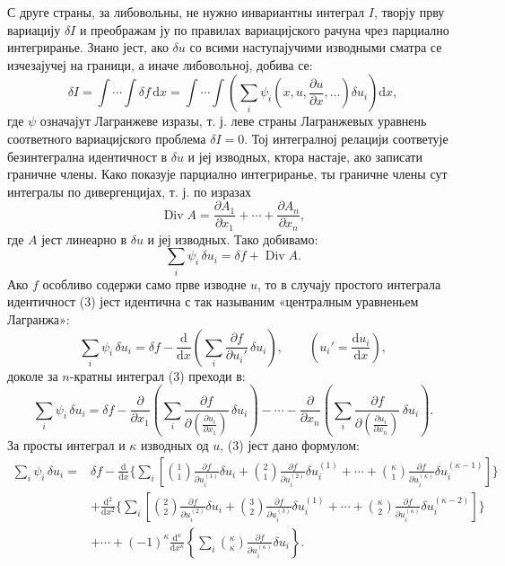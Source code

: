 ﻿\documentclass[11pt]{article}
\providecommand{\p}{\partial}
\providecommand{\dd}{\mathrm d}
\DeclareMathOperator{\Div}{Div}
\begin{document}
С друге страны, за либовольны, не нужно инвариантны интеграл \(I\), творју прву вариацију \(\delta I\) и преображам ју по правилах вариацијского рачуна чрез парциално интегриранье. Знано јест, ако \(\delta u\) со всими наступајучими изводными сматра се изчезајучеј на граници, а иначе либовольној, добива се:
\begin{equation}
\delta I=\int\!\cdots\!\int \delta f\,\dd x
=\int\!\cdots\!\int\left(\sum_i\psi_i\!\left(x,u,\frac{\p u}{\p x},\ldots\right)\delta u_i\right)\dd x,
\tag{2}
\end{equation}
где \(\psi\) означајут Лагранжеве изразы, т. ј. леве страны Лагранжевых уравнень соответного вариацијского проблема \(\delta I=0\). Тој интегралној релацији соответује безинтегрална идентичност в \(\delta u\) и јеј изводных, ктора настаје, ако записати граничне члены. Како показује парциално интегриранье, ты граничне члены сут интегралы по дивергенцијах, т. ј. по изразах
\[
\Div A=\frac{\p A_1}{\p x_1}+\cdots+\frac{\p A_n}{\p x_n},
\]
где \(A\) јест линеарно в \(\delta u\) и јеј изводных. Тако добивамо:
\begin{equation}
\sum_i\psi_i\,\delta u_i=\delta f+\Div A.
\tag{3}
\end{equation}
Ако \(f\) особливо содержи само прве изводне \(u\), то в случају простого интеграла идентичност (3) јест идентична с так называним «централным уравненьем Лагранжа»:
\begin{equation}
\sum_i \psi_i\,\delta u_i
=\delta f-\frac{\dd}{\dd x}\left(\sum_i\frac{\p f}{\p u_i'}\,\delta u_i\right),
\qquad \left(u_i'=\frac{\dd u_i}{\dd x}\right),
\tag{4}
\end{equation}
доколе за \(n\)-кратны интеграл (3) преходи в:
\begin{equation}
\sum_i\psi_i\,\delta u_i
=
\delta f
-\frac{\p}{\p x_1}\left(\sum_i\frac{\p f}{\p \left(\frac{\p u_i}{\p x_1}\right)}\,\delta u_i\right)
-\cdots
-\frac{\p}{\p x_n}\left(\sum_i\frac{\p f}{\p \left(\frac{\p u_i}{\p x_n}\right)}\,\delta u_i\right).
\tag{5}
\end{equation}
За просты интеграл и \(\kappa\) изводных од \(u\), (3) јест дано формулом:
\begin{equation}
\begin{aligned}
\sum_i\psi_i\,\delta u_i
={}&\delta f
-\frac{\dd}{\dd x}\Bigg\{\sum_i\left[
\binom{1}{1}\frac{\p f}{\p u_i^{(1)}}\delta u_i
+\binom{2}{1}\frac{\p f}{\p u_i^{(2)}}\delta u_i^{(1)}
+\cdots+
\binom{\kappa}{1}\frac{\p f}{\p u_i^{(\kappa)}}\delta u_i^{(\kappa-1)}
\right]\Bigg\}\\
&+\frac{\dd^2}{\dd x^2}\Bigg\{\sum_i\left[
\binom{2}{2}\frac{\p f}{\p u_i^{(2)}}\delta u_i
+\binom{3}{2}\frac{\p f}{\p u_i^{(3)}}\delta u_i^{(1)}
+\cdots+
\binom{\kappa}{2}\frac{\p f}{\p u_i^{(\kappa)}}\delta u_i^{(\kappa-2)}
\right]\Bigg\}\\
&+\cdots
+(-1)^\kappa\frac{\dd^\kappa}{\dd x^\kappa}
\left\{\sum_i\binom{\kappa}{\kappa}
\frac{\p f}{\p u_i^{(\kappa)}}\delta u_i\right\}.
\end{aligned}
\tag{6}
\end{equation}
\end{document}
